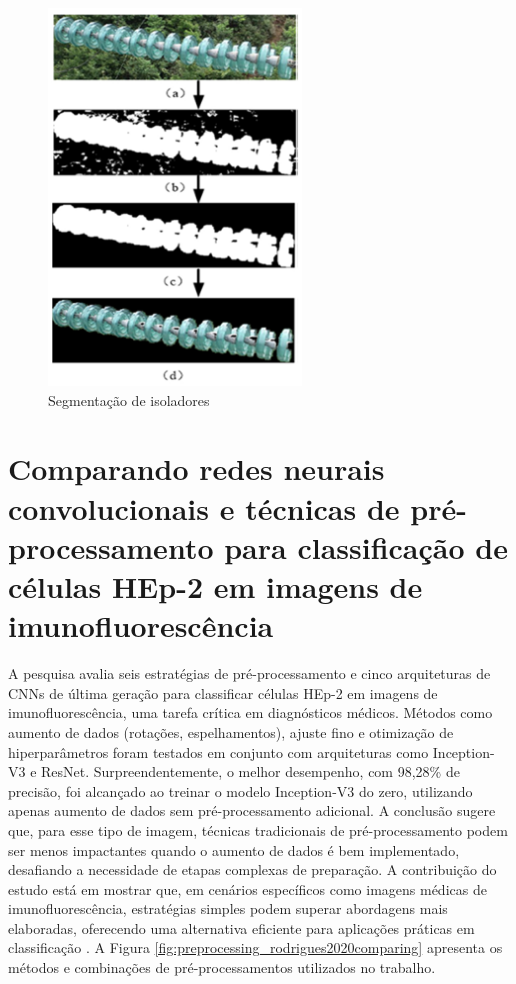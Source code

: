 \begin{figure}[H]
    \centering
    \caption{\label{fig:segmentacao_zhang2022}Segmentação de isoladores}
    \includegraphics[width=0.6\textwidth]{img/trabalhos_relacionados/segmentacao_zhang2022.png}
\end{figure}

\section{Comparando redes neurais convolucionais e técnicas de pré- processamento para classificação de células HEp-2 em imagens de imunofluorescência}
A pesquisa avalia seis estratégias de pré-processamento e cinco arquiteturas de CNNs de última geração para classificar células HEp-2 em imagens de imunofluorescência, uma tarefa crítica em diagnósticos médicos. Métodos como aumento de dados (rotações, espelhamentos), ajuste fino e otimização de hiperparâmetros foram testados em conjunto com arquiteturas como Inception-V3 e ResNet. Surpreendentemente, o melhor desempenho, com 98,28\% de precisão, foi alcançado ao treinar o modelo Inception-V3 do zero, utilizando apenas aumento de dados sem pré-processamento adicional. A conclusão sugere que, para esse tipo de imagem, técnicas tradicionais de pré-processamento podem ser menos impactantes quando o aumento de dados é bem implementado, desafiando a necessidade de etapas complexas de preparação. A contribuição do estudo está em mostrar que, em cenários específicos como imagens médicas de imunofluorescência, estratégias simples podem superar abordagens mais elaboradas, oferecendo uma alternativa eficiente para aplicações práticas em classificação \cite{rodrigues2020comparing}.
A Figura \ref{fig:preprocessing_rodrigues2020comparing} apresenta os métodos e combinações de pré-processamentos utilizados no trabalho.

